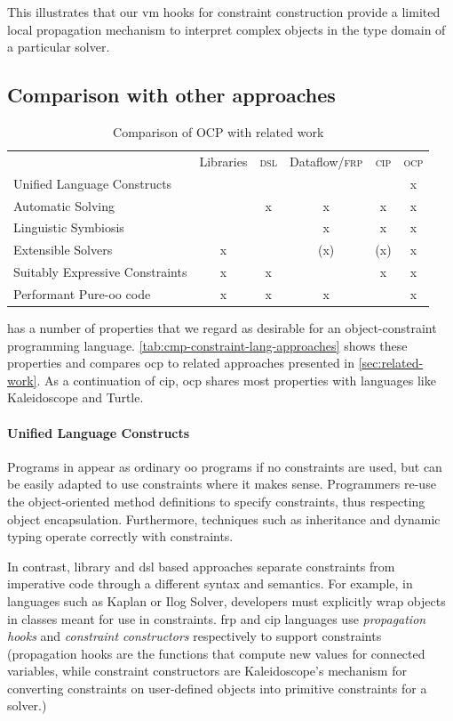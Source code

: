 This illustrates that our \ac{vm} hooks for constraint construction
provide a limited local propagation mechanism to interpret complex
objects in the type domain of a particular solver.

\subsection{Comparison with other approaches}
\label{sec:comparison}

\begin{table}[b!]
  \centering
  \begin{tabular}{l|c|c|c|c|c}
    & Libraries & \textsc{dsl} & Dataflow/\textsc{frp} & \textsc{cip} & \textsc{ocp} \\
    Unified Language Constructs & & & & & x \\
    Automatic Solving & & x & x & x & x \\
    Linguistic Symbiosis & & & x & x & x \\
    Extensible Solvers & x & & (x) & (x) & x \\
    Suitably Expressive Constraints & x & x & & x & x \\
    Performant Pure-\ac{oo} code & x & x & x & & x \\
  \end{tabular}
  \caption{Comparison of OCP with related work}
  \label{tab:cmp-constraint-lang-approaches}
\end{table}

\langname has a number of properties that we regard as desirable for
an object-constraint programming
language. \autoref{tab:cmp-constraint-lang-approaches} shows these
properties and compares \ac{ocp} to related approaches presented in
\autoref{sec:related-work}.  As a continuation of
\ac{cip}, \ac{ocp} shares most properties with languages like
Kaleidoscope and Turtle.

\paragraph{Unified Language Constructs}
Programs in \langname appear as ordinary \ac{oo} programs if no
constraints are used, but can be easily adapted to use constraints
where it makes sense. Programmers re-use the object-oriented method
definitions to specify constraints, thus respecting object
encapsulation. Furthermore, techniques such as inheritance and dynamic
typing operate correctly with constraints.

In contrast, library and \ac{dsl} based approaches separate
constraints from imperative code through a different syntax and
semantics. For example, in languages such as Kaplan or Ilog Solver,
developers must explicitly wrap objects in classes meant for use in
constraints. \Ac{frp} and \ac{cip} languages use \emph{propagation
  hooks} and \emph{constraint constructors} respectively to support
constraints (propagation hooks are the functions that compute new
values for connected variables, while constraint constructors are 
Kaleidoscope's mechanism for converting constraints on user-defined objects
into primitive constraints for a solver.)

